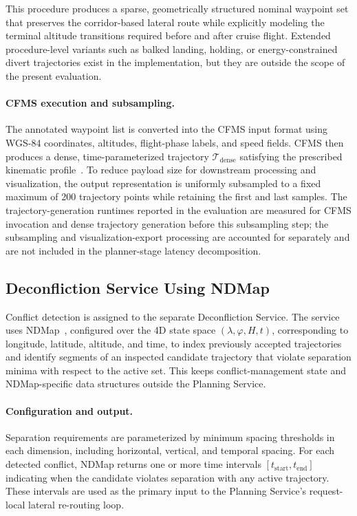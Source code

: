 This procedure produces a sparse, geometrically structured nominal waypoint set that preserves the corridor-based lateral route while explicitly modeling the terminal altitude transitions required before and after cruise flight. Extended procedure-level variants such as balked landing, holding, or energy-constrained divert trajectories exist in the implementation, but they are outside the scope of the present evaluation.

\paragraph{CFMS execution and subsampling.}
The annotated waypoint list is converted into the CFMS input format using WGS-84 coordinates, altitudes, flight-phase labels, and speed fields. CFMS then produces a dense, time-parameterized trajectory \(\mathcal{T}_{\mathrm{dense}}\) satisfying the prescribed kinematic profile~\cite{morscheck2021cfms}. To reduce payload size for downstream processing and visualization, the output representation is uniformly subsampled to a fixed maximum of 200 trajectory points while retaining the first and last samples. The trajectory-generation runtimes reported in the evaluation are measured for CFMS invocation and dense trajectory generation before this subsampling step; the subsampling and visualization-export processing are accounted for separately and are not included in the planner-stage latency decomposition.

\subsection{Deconfliction Service Using NDMap}
\label{sec:conflict_detection}

Conflict detection is assigned to the separate Deconfliction Service. The service uses NDMap~\cite{NDMap}, configured over the 4D state space \((\lambda,\varphi,H,t)\), corresponding to longitude, latitude, altitude, and time, to index previously accepted trajectories and identify segments of an inspected candidate trajectory that violate separation minima with respect to the active set. This keeps conflict-management state and NDMap-specific data structures outside the Planning Service.

\paragraph{Configuration and output.}
Separation requirements are parameterized by minimum spacing thresholds in each dimension, including horizontal, vertical, and temporal spacing. For each detected conflict, NDMap returns one or more time intervals \([t_{\text{start}}, t_{\text{end}}]\) indicating when the candidate violates separation with any active trajectory. These intervals are used as the primary input to the Planning Service's request-local lateral re-routing loop.

